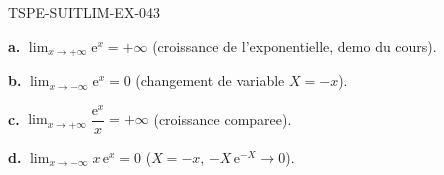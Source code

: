 \begin{corrige}{TSPE-SUITLIM-EX-043}

\textbf{a.} $\lim_{x \to +\infty} \mathrm{e}^x = \boxed{+\infty}$ (croissance de l'exponentielle, demo du cours).

\textbf{b.} $\lim_{x \to -\infty} \mathrm{e}^x = \boxed{0}$ (changement de variable $X=-x$).

\textbf{c.} $\lim_{x \to +\infty} \dfrac{\mathrm{e}^x}{x} = \boxed{+\infty}$ (croissance comparee).

\textbf{d.} $\lim_{x \to -\infty} x\,\mathrm{e}^x = \boxed{0}$ ($X=-x$, $-X\,\mathrm{e}^{-X} \to 0$).

\end{corrige}
